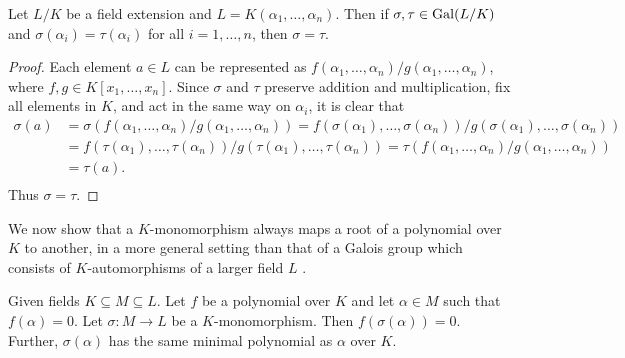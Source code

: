 \begin{theorem} \label{thm:galois-group-determined-by-generator}
	Let $L/K$ be a field extension and $L = K(\alpha_1, \ldots, \alpha_n)$. Then if $\sigma, \tau \in \operatorname{Gal}(L/K)$ and $\sigma(\alpha_i) = \tau(\alpha_i)$ for all $i = 1, \dots, n$, then $\sigma = \tau$. 
\end{theorem}

\begin{proof}
	Each element $a \in L$ can be represented as $ f(\alpha_1, \dots, \alpha_n) / g(\alpha_1, \dots, \alpha_n)$, where $f, g \in K[x_1, \ldots, x_n]$. Since $\sigma$ and $\tau$ preserve addition and multiplication, fix all elements in $K$, and act in the same way on $\alpha_i$, it is clear that
	\begin{equation*}
		\begin{split}
		\sigma(a) 
			&= \sigma(f(\alpha_1, \dots, \alpha_n) / g(\alpha_1, \dots, \alpha_n)) 
			= f(\sigma(\alpha_1), \dots, \sigma(\alpha_n)) / g(\sigma(\alpha_1), \dots, \sigma(\alpha_n)) \\
			&= f(\tau(\alpha_1), \dots, \tau(\alpha_n)) / g(\tau(\alpha_1), \dots, \tau(\alpha_n))  
			=  \tau(f(\alpha_1, \dots, \alpha_n) / g(\alpha_1, \dots, \alpha_n)) \\
			&= \tau(a).\\ 
		\end{split}
	\end{equation*}
Thus $\sigma = \tau$.
\end{proof}






We now show that a $K$-monomorphism always maps a root of a polynomial over $K$ to another, in a more general setting than that of a Galois group which consists of $K$-automorphisms of a larger field $L$ \citep[p.~16]{morandi_field_1996}. 

\begin{theorem} \label{thm:galois-group-permutes-zeros}
Given fields $K \subseteq M \subseteq L$. Let $f$ be a polynomial over $K$ and let $\alpha \in M$ such that $f(\alpha) = 0$. Let $\sigma : M \to L$ be a $K$-monomorphism. Then $f(\sigma(\alpha)) = 0$. Further, $\sigma(\alpha)$ has the same minimal polynomial as $\alpha$ over $K$. 

\end{theorem}

